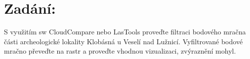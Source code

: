 \section{Zadání:}
S využitím sw CloudCompare nebo LasTools proveďte filtraci bodového mračna
části archeologické lokality Klobásná u Veselí nad Lužnicí. Vyfiltrované bodové mračno převeďte na rastr a proveďte vhodnou vizualizaci, zvýraznění mohyl.